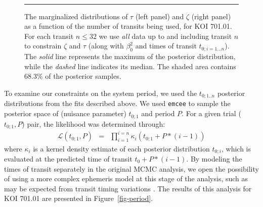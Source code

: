 \begin{figure}[t] 
\begin{center} 
\mbox{
\quad
{}
}
\caption{The marginalized distributions of $\tau$ (left panel) and
  $\zeta$ (right panel) as a function of the number of transits being
  used, for KOI 701.01.  For each transit $n \leq 32$ we use {\it all}
  data up to and including transit $n$ to constrain $\zeta$ and $\tau$
  (along with $\beta_0^2$ and times of transit $t_{0;i=1...n}$).  The
  {\it solid} line represents the maximum of the posterior
  distribution, while the {\it dashed} line indicates its median.  The
  shaded area contains 68.3\% of the posterior samples.}
\hspace*{\fill}  
\hrule
\label{fig-marg} 
\end{center} 
\end{figure}

To examine our constraints on the system period, we used the
$t_{0;1..n}$ posterior distributions from the fits described above.
We used {\tt emcee} to sample the posterior space of (nuisance
parameter) $t_{0;1}$ and period $P$.  For a given trial ($t_{0;1}, P$)
pair, the likelihood was determined through:
\begin{eqnarray}
\mathcal{L}(t_{0;1}, P) & = & \prod_{i=1}^{i=n} \kappa_i(t_{0;1} + P * (i-1))
\end{eqnarray}
where $\kappa_i$ is a kernel density estimate of each posterior
distribution $t_{0;i}$, which is evaluated at the predicted time of
transit $t_0 + P * (i-1)$.  By modeling the times of transit
separately in the original MCMC analysis, we open the possibility of
using a more complex ephemeris model at this stage of the analysis,
such as may be expected from transit timing variations
\citep{2005MNRAS.359..567A,2005Sci...307.1288H}.  The results of this
analysis for KOI 701.01 are presented in Figure~\ref{fig-period}.

